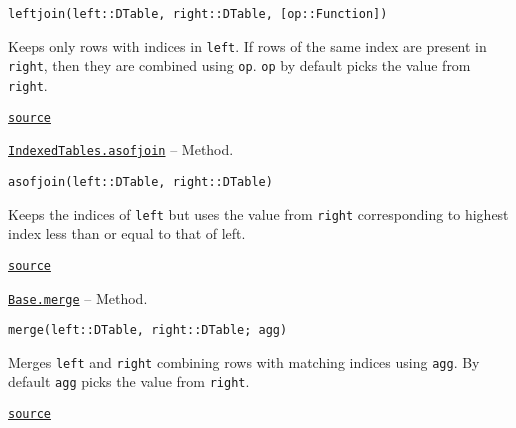 \documentclass{memoir}
\begin{document}
\begin{adjustwidth}{2em}{0pt}


\begin{lstlisting}
leftjoin(left::DTable, right::DTable, [op::Function])
\end{lstlisting}

Keeps only rows with indices in \texttt{left}. If rows of the same index are present in \texttt{right}, then they are combined using \texttt{op}. \texttt{op} by default picks the value from \texttt{right}.



\href{https://github.com/JuliaComputing/JuliaDB.jl/tree/9e65f8c3b0e9c2e27c3334a093a5aefc6c7d1246/src/join.jl#L84-L90}{\texttt{source}}


\end{adjustwidth}
\hypertarget{3261855016230238153}{} 
\hyperlink{3261855016230238153}{\texttt{IndexedTables.asofjoin}}  -- {Method.}

\begin{adjustwidth}{2em}{0pt}


\begin{lstlisting}
asofjoin(left::DTable, right::DTable)
\end{lstlisting}

Keeps the indices of \texttt{left} but uses the value from \texttt{right} corresponding to highest index less than or equal to that of left.



\href{https://github.com/JuliaComputing/JuliaDB.jl/tree/9e65f8c3b0e9c2e27c3334a093a5aefc6c7d1246/src/join.jl#L127-L132}{\texttt{source}}


\end{adjustwidth}
\hypertarget{2455715143786975189}{} 
\hyperlink{2455715143786975189}{\texttt{Base.merge}}  -- {Method.}

\begin{adjustwidth}{2em}{0pt}


\begin{lstlisting}
merge(left::DTable, right::DTable; agg)
\end{lstlisting}

Merges \texttt{left} and \texttt{right} combining rows with matching indices using \texttt{agg}. By default \texttt{agg} picks the value from \texttt{right}.



\href{https://github.com/JuliaComputing/JuliaDB.jl/tree/9e65f8c3b0e9c2e27c3334a093a5aefc6c7d1246/src/join.jl#L137-L142}{\texttt{source}}


\end{adjustwidth}
\end{document}
